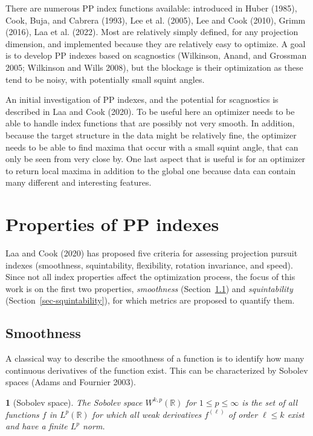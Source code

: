 \documentclass[
  12pt,
]{interact}
\theoremstyle{plain}
\newtheorem{defn}{\protect\definitionname}
\providecommand{\definitionname}{Definition}
\begin{document}
There are numerous PP index functions available: introduced in Huber
(1985), Cook, Buja, and Cabrera (1993), Lee et al. (2005), Lee and Cook
(2010), Grimm (2016), Laa et al. (2022). Most are relatively simply
defined, for any projection dimension, and implemented because they are
relatively easy to optimize. A goal is to develop PP indexes based on
scagnostics (Wilkinson, Anand, and Grossman 2005; Wilkinson and Wills
2008), but the blockage is their optimization as these tend to be noisy,
with potentially small squint angles.

An initial investigation of PP indexes, and the potential for
scagnostics is described in Laa and Cook (2020). To be useful here an
optimizer needs to be able to handle index functions that are possibly
not very smooth. In addition, because the target structure in the data
might be relatively fine, the optimizer needs to be able to find maxima
that occur with a small squint angle, that can only be seen from very
close by. One last aspect that is useful is for an optimizer to return
local maxima in addition to the global one because data can contain many
different and interesting features.

\section{Properties of PP indexes}\label{sec-PP-properties}

Laa and Cook (2020) has proposed five criteria for assessing projection
pursuit indexes (smoothness, squintability, flexibility, rotation
invariance, and speed). Since not all index properties affect the
optimization process, the focus of this work is on the first two
properties, \emph{smoothness} (Section~\ref{sec-smoothness}) and
\emph{squintability} (Section~\ref{sec-squintability}), for which
metrics are proposed to quantify them.

\subsection{Smoothness}\label{sec-smoothness}

A classical way to describe the smoothness of a function is to identify
how many continuous derivatives of the function exist. This can be
characterized by Sobolev spaces (Adams and Fournier 2003).

\begin{defn}[Sobolev space]\label{def:sobolev_space}
The Sobolev space $W^{k,p}(\mathbb{R})$ for $1\leq p\leq \infty$ is the set of all functions $f$ in $L^p(\mathbb{R})$ for which all weak derivatives $f^{(\ell)}$ of order $\ell\leq k$ exist and have a finite $L^p$ norm.
\end{defn}
\end{document}
